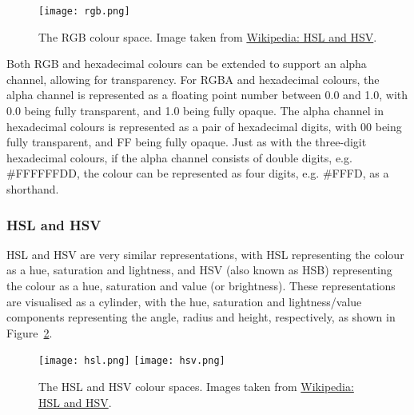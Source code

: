 \documentclass[../main.tex]{subfiles}
\begin{document}
                \begin{figure}[H]
                    \centering
                    \texttt{[image: rgb.png]}
                        \caption{The RGB colour space.
                            Image taken from \href{https://en.wikipedia.org/wiki/HSL_and_HSV}{Wikipedia:
                                    HSL and HSV}.
                        }
                        \label{fig:rgb}
                \end{figure}

                Both RGB and hexadecimal colours can be extended to support an alpha channel,
                    allowing for transparency.
                For RGBA and hexadecimal colours, the alpha channel is represented as a
                    floating point number between 0.0 and 1.0, with 0.0 being fully transparent,
                    and 1.0 being fully opaque.
                The alpha channel in hexadecimal colours is represented as a pair of
                    hexadecimal digits, with 00 being fully transparent, and FF being fully opaque.
                Just as with the three-digit hexadecimal colours, if the alpha channel consists
                    of double digits, e.g. \#FFFFFFDD, the colour can be represented as four
                    digits, e.g. \#FFFD, as a shorthand.

            \subsubsection{HSL and HSV}
                HSL and HSV are very similar representations, with HSL representing the colour
                    as a hue, saturation and lightness, and HSV (also known as HSB) representing
                    the colour as a hue, saturation and value (or brightness).
                These representations are visualised as a cylinder, with the hue, saturation
                    and lightness/value components representing the angle, radius and height,
                    respectively, as shown in Figure~\ref{fig:hsl}.

                \begin{figure}[H]
                    \centering
                    \texttt{[image: hsl.png]}
                    \texttt{[image: hsv.png]}
                        \caption{The HSL and HSV colour spaces.
                            Images taken from \href{https://en.wikipedia.org/wiki/HSL_and_HSV}{Wikipedia:
                                    HSL and HSV}.
                        }
                        \label{fig:hsl}
                \end{figure}
\end{document}
